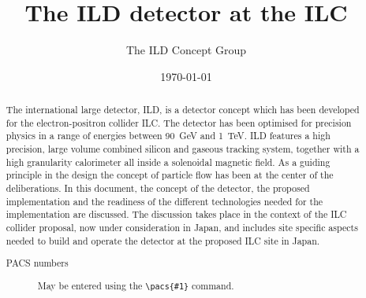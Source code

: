 \documentclass[%
 amsmath,amssymb,
 aps,
]{revtex4-1}
\begin{document}


\title{The ILD detector at the ILC}%

\author{The ILD Concept Group}




\date{\today}%

\begin{abstract}
The international large detector, ILD, is a detector concept which has been developed for the electron-positron collider ILC. The detector has been optimised for precision physics in a range of energies between 90~GeV and 1~TeV. ILD features a high precision, large volume combined silicon and gaseous tracking system, together with a high granularity calorimeter all inside a solenoidal magnetic field. As a guiding principle in the design the concept of particle flow has been at the center of the deliberations. In this document, the concept of the detector, the proposed implementation and the readiness of the different technologies needed for the implementation are discussed. The discussion takes place in the context of the ILC collider proposal, now under consideration in Japan, and includes site specific aspects needed to build and operate the detector at the proposed ILC site in Japan.

\begin{description}
\item[PACS numbers]
May be entered using the \verb+\pacs{#1}+ command.
\end{description}
\end{abstract}
\end{document}
